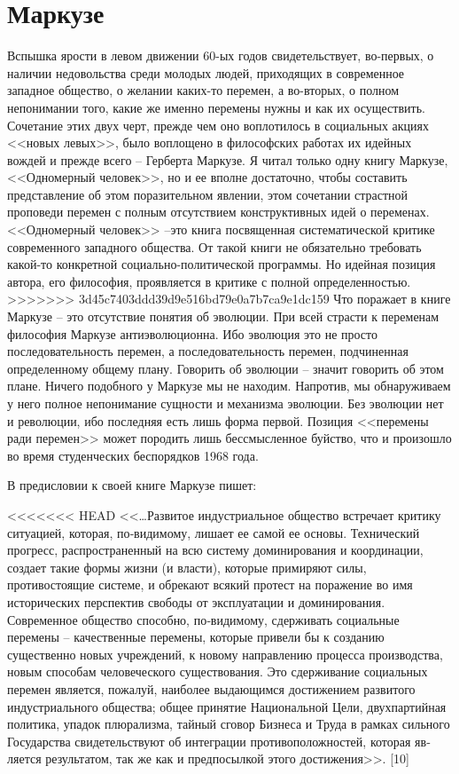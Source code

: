 \documentclass{book}
\begin{document}
{\section{Маркузе}

Вспышка ярости в левом движении 60-ых годов свидетель­ствует, во-первых, о наличии недовольства среди молодых лю­дей, приходящих в современное западное общество, о жела­нии каких-то перемен, а во-вторых, о полном непонимании то­го, какие же именно перемены нужны и как их осуществить. Сочетание этих двух черт, прежде чем оно воплотилось в социальных акциях <<новых левых>>, было воплощено в философских работах их идейных вождей и прежде всего -- Герберта Маркузе. Я читал только одну книгу Маркузе, <<Одномерный человек>>, но и ее вполне достаточно, чтобы составить представление об этом поразительном явлении, этом сочетании страстной проповеди перемен с полным отсутствием конструктивных идей о переменах. <<Одномерный человек>> --это книга посвященная систематической критике современного западного общества. От такой книги не обязательно требовать какой-то конкретной социально-политической программы. Но идейная позиция автора, его философия, проявляется в критике с полной определенностью.
>>>>>>> 3d45c7403ddd39d9e516bd79e0a7b7ca9e1dc159
Что поражает в книге Маркузе -- это отсутствие понятия об эволюции.  При всей страсти к переменам философия Маркузе антиэволюционна. Ибо эволюция это не просто последовательность перемен, а последовательность перемен, подчиненная определенному общему плану. Говорить об эволюции -- значит говорить об этом плане. Ничего подобного у Маркузе мы не находим. Напротив, мы обнаруживаем у него полное непонимание сущности и механизма эволюции. Без эволюции нет и революции, ибо последняя есть лишь форма первой. Позиция <<перемены ради перемен>> может породить лишь бессмысленное буйство, что и произошло во время студенческих беспо­рядков 1968 года.

В предисловии к своей книге Маркузе пишет:

<<<<<<< HEAD
<<\ldots Развитое индустриальное общество встречает критику ситуацией, которая, по‑видимому, лишает ее самой ее основы. Технический прогресс, распространенный на всю систему доминирования и координации, создает такие формы жизни (и власти), которые примиряют силы, противостоящие системе, и обрекают всякий протест на поражение во имя исторических перспектив свободы от эксплуатации и доминирования. Современное общество способно, по‑видимому, сдерживать социальные перемены -- качественные перемены, которые привели бы к созданию существенно новых учреждений, к новому направлению процесса производства, новым способам человеческого существования. Это сдерживание социальных перемен являет­ся, пожалуй, наиболее выдающимся достижением развитого индустриального общества; общее принятие Национальной Цели, двухпартийная политика, упадок плюрализма, тайный сговор Бизнеса и Труда в рамках сильного Государства сви­детельствуют об интеграции противоположностей, которая яв­ляется результатом, так же как и предпосылкой этого дости­жения>>. [10]

}
\end{document}
